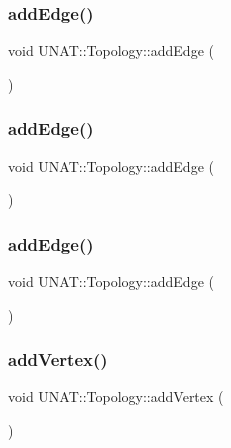 \subsubsection{\texorpdfstring{addEdge()}{addEdge()}\hspace{0.1cm}{\footnotesize\ttfamily [1/3]}}
{\footnotesize\ttfamily void U\+N\+A\+T\+::\+Topology\+::add\+Edge (\begin{DoxyParamCaption}{ }\end{DoxyParamCaption})}

\mbox{\label{classUNAT_1_1Topology_a6f341852613126c689a10a2785a08c55}} 
\subsubsection{\texorpdfstring{addEdge()}{addEdge()}\hspace{0.1cm}{\footnotesize\ttfamily [2/3]}}
{\footnotesize\ttfamily void U\+N\+A\+T\+::\+Topology\+::add\+Edge (\begin{DoxyParamCaption}{ }\end{DoxyParamCaption})}

\mbox{\label{classUNAT_1_1Topology_a6f341852613126c689a10a2785a08c55}} 
\subsubsection{\texorpdfstring{addEdge()}{addEdge()}\hspace{0.1cm}{\footnotesize\ttfamily [3/3]}}
{\footnotesize\ttfamily void U\+N\+A\+T\+::\+Topology\+::add\+Edge (\begin{DoxyParamCaption}{ }\end{DoxyParamCaption})}

\mbox{\label{classUNAT_1_1Topology_adfc7a4148d5430ae7af6ed1d499875f7}} 
\subsubsection{\texorpdfstring{addVertex()}{addVertex()}\hspace{0.1cm}{\footnotesize\ttfamily [1/3]}}
{\footnotesize\ttfamily void U\+N\+A\+T\+::\+Topology\+::add\+Vertex (\begin{DoxyParamCaption}{ }\end{DoxyParamCaption})}

